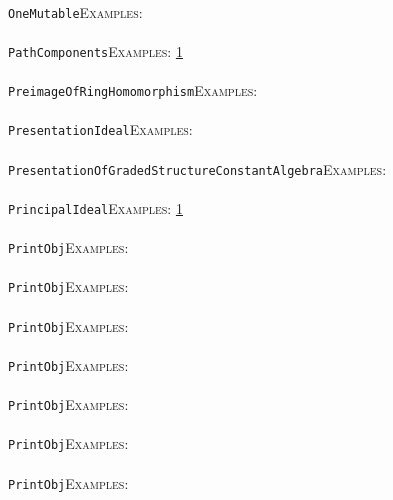 \documentclass[a4paper,11pt]{report}
\begin{document}
{{ \\
 \texttt{OneMutable}{\nobreakspace}{\nobreakspace}{\nobreakspace}{\nobreakspace}\textsc{Examples:} \\
 \\
 \texttt{PathComponents}{\nobreakspace}{\nobreakspace}{\nobreakspace}{\nobreakspace}\textsc{Examples:} \href{../www/SideLinks/About/aboutQuandles.html} {1}{\nobreakspace} \\
 \\
 \texttt{PreimageOfRingHomomorphism}{\nobreakspace}{\nobreakspace}{\nobreakspace}{\nobreakspace}\textsc{Examples:} \\
 \\
 \texttt{PresentationIdeal}{\nobreakspace}{\nobreakspace}{\nobreakspace}{\nobreakspace}\textsc{Examples:} \\
 \\
 \texttt{PresentationOfGradedStructureConstantAlgebra}{\nobreakspace}{\nobreakspace}{\nobreakspace}{\nobreakspace}\textsc{Examples:} \\
 \\
 \texttt{PrincipalIdeal}{\nobreakspace}{\nobreakspace}{\nobreakspace}{\nobreakspace}\textsc{Examples:} \href{tutorial/chap10.html} {1}{\nobreakspace} \\
 \\
 \texttt{PrintObj}{\nobreakspace}{\nobreakspace}{\nobreakspace}{\nobreakspace}\textsc{Examples:} \\
 \\
 \texttt{PrintObj}{\nobreakspace}{\nobreakspace}{\nobreakspace}{\nobreakspace}\textsc{Examples:} \\
 \\
 \texttt{PrintObj}{\nobreakspace}{\nobreakspace}{\nobreakspace}{\nobreakspace}\textsc{Examples:} \\
 \\
 \texttt{PrintObj}{\nobreakspace}{\nobreakspace}{\nobreakspace}{\nobreakspace}\textsc{Examples:} \\
 \\
 \texttt{PrintObj}{\nobreakspace}{\nobreakspace}{\nobreakspace}{\nobreakspace}\textsc{Examples:} \\
 \\
 \texttt{PrintObj}{\nobreakspace}{\nobreakspace}{\nobreakspace}{\nobreakspace}\textsc{Examples:} \\
 \\
 \texttt{PrintObj}{\nobreakspace}{\nobreakspace}{\nobreakspace}{\nobreakspace}\textsc{Examples:} \\
 \\
}}
\end{document}

